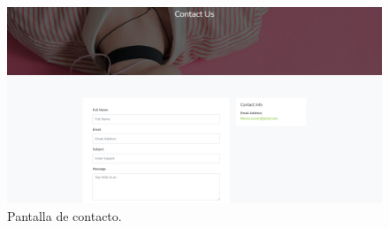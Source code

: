 \documentclass[12pt, a4paper, titlepage]{article}
\begin{document}
		\begin{figure}[H] 
			\includegraphics[width=13.5cm]{./Imagenes/Capturas/pcontact.png}
			\centering \caption{Pantalla de contacto.}
		\end{figure}
		
\end{document}
